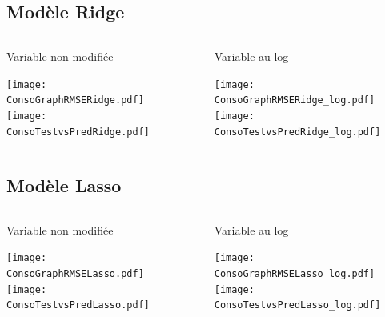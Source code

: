 \documentclass[8pt,aspectratio=169,hyperref={unicode=true}]{beamer}
\begin{document}
\subsection{Modèle Ridge}
\begin{frame}[t]{\insertsubsection}
  \begin{columns}
    \begin{column}{.33\textwidth}
      {\centering Variable non modifiée

      }
      \texttt{[image: ConsoGraphRMSERidge.pdf]}
      \texttt{[image: ConsoTestvsPredRidge.pdf]}
    \end{column}
    \begin{column}{.33\textwidth}

    \end{column}
    \begin{column}{.33\textwidth}
      {\centering Variable au log

      }
      \texttt{[image: ConsoGraphRMSERidge\_log.pdf]}
      \texttt{[image: ConsoTestvsPredRidge\_log.pdf]}
    \end{column}
  \end{columns}
\end{frame}

\subsection{Modèle Lasso}
\begin{frame}[t]{\insertsubsection}
  \begin{columns}
    \begin{column}{.33\textwidth}
      {\centering Variable non modifiée

      }
      \texttt{[image: ConsoGraphRMSELasso.pdf]}
      \texttt{[image: ConsoTestvsPredLasso.pdf]}
    \end{column}
    \begin{column}{.33\textwidth}

    \end{column}
    \begin{column}{.33\textwidth}
      {\centering Variable au log

      }
      \texttt{[image: ConsoGraphRMSELasso\_log.pdf]}
      \texttt{[image: ConsoTestvsPredLasso\_log.pdf]}
    \end{column}
  \end{columns}
\end{frame}
\end{document}
